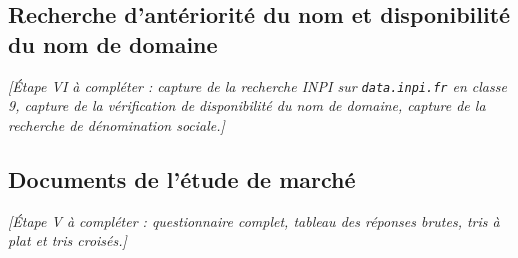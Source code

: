 


\subsection{Recherche d'antériorité du nom et disponibilité du nom de domaine}

\textit{[Étape VI \textendash{} à compléter : capture de la recherche INPI sur
\texttt{data.inpi.fr} en classe 9, capture de la vérification de disponibilité
du nom de domaine, capture de la recherche de dénomination sociale.]}

\subsection{Documents de l'étude de marché}

\textit{[Étape V \textendash{} à compléter : questionnaire complet, tableau des
réponses brutes, tris à plat et tris croisés.]}
